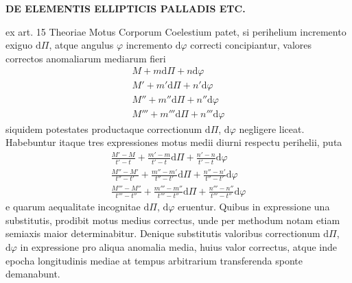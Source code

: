 \par\clearpage
\begingroup
\pagestyle{empty}
\setlength{\abovedisplayskip}{6pt plus 1pt minus 2pt}
\setlength{\belowdisplayskip}{6pt plus 1pt minus 2pt}
\setlength{\abovedisplayshortskip}{3pt plus 1pt}
\setlength{\belowdisplayshortskip}{4pt plus 1pt minus 1pt}
\setlength{\jot}{2pt}
\newcommand{\GaussVIGathering}[2]{%
  \fancypagestyle{gaussVIGathering}{%
    \fancyhf{}%
    \renewcommand{\headrulewidth}{0pt}%
    \renewcommand{\footrulewidth}{0pt}%
    \fancyfoot[C]{\makebox[\textwidth][l]{%
      \hspace*{.025\textwidth}{\footnotesize\bfseries #1}\hfill
      {\normalsize\bfseries\textls[90]{#2}}\hspace*{.18\textwidth}}}%
  }%
  \thispagestyle{gaussVIGathering}%
}
\thispagestyle{empty}
\noindent{}%
\makebox[12mm][l]{}%
\parbox[t]{\dimexpr\linewidth-24mm\relax}{\centering\footnotesize\bfseries DE ELEMENTIS ELLIPTICIS PALLADIS ETC.\par}%
\par\nobreak\medskip
\noindent ex art. 15 Theoriae Motus Corporum Coelestium patet, si perihelium incremento exiguo $\mathrm d\Pi$, atque angulus $\varphi$ incremento $\mathrm d\varphi$ correcti concipiantur, valores correctos anomaliarum mediarum fieri
\[
\begin{gathered}
M+m\mathrm d\Pi+n\mathrm d\varphi\\
M'+m'\mathrm d\Pi+n'\mathrm d\varphi\\
M''+m''\mathrm d\Pi+n''\mathrm d\varphi\\
M'''+m'''\mathrm d\Pi+n'''\mathrm d\varphi
\end{gathered}
\]
siquidem potestates productaque correctionum $\mathrm d\Pi$, $\mathrm d\varphi$ negligere liceat. Habebuntur itaque tres expressiones motus medii diurni respectu perihelii, puta
\[
\begin{gathered}
\frac{M'-M}{t'-t}+\frac{m'-m}{t'-t}\mathrm d\Pi+\frac{n'-n}{t'-t}\mathrm d\varphi\\[5pt]
\frac{M''-M'}{t''-t'}+\frac{m''-m'}{t''-t'}\mathrm d\Pi+\frac{n''-n'}{t''-t'}\mathrm d\varphi\\[5pt]
\frac{M'''-M''}{t'''-t''}+\frac{m'''-m''}{t'''-t''}\mathrm d\Pi+\frac{n'''-n''}{t'''-t''}\mathrm d\varphi
\end{gathered}
\]
e quarum aequalitate incognitae $\mathrm d\Pi$, $\mathrm d\varphi$ eruentur. Quibus in expressione una substitutis, prodibit motus medius correctus, unde per methodum notam etiam semiaxis maior determinabitur. Denique substitutis valoribus correctionum $\mathrm d\Pi$, $\mathrm d\varphi$ in expressione pro aliqua anomalia media, huius valor correctus, atque inde epocha longitudinis mediae at tempus arbitrarium transferenda sponte demanabunt.

